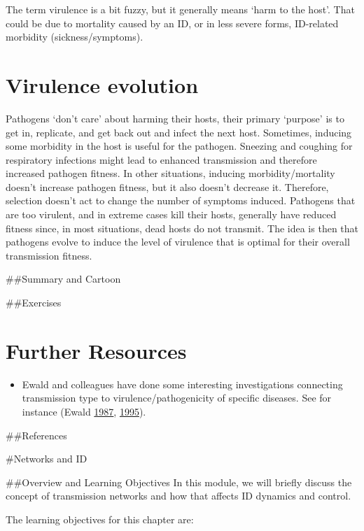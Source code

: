 \documentclass[]{book}
\providecommand{\tightlist}{%
  \setlength{\itemsep}{0pt}\setlength{\parskip}{0pt}}
\theoremstyle{definition}
\theoremstyle{definition}
\theoremstyle{definition}
\theoremstyle{remark}
\begin{document}
The term virulence is a bit fuzzy, but it generally means `harm to the
host'. That could be due to mortality caused by an ID, or in less severe
forms, ID-related morbidity (sickness/symptoms).

\hypertarget{virulence-evolution}{%
\section{Virulence evolution}\label{virulence-evolution}}

Pathogens `don't care' about harming their hosts, their primary
`purpose' is to get in, replicate, and get back out and infect the next
host. Sometimes, inducing some morbidity in the host is useful for the
pathogen. Sneezing and coughing for respiratory infections might lead to
enhanced transmission and therefore increased pathogen fitness. In other
situations, inducing morbidity/mortality doesn't increase pathogen
fitness, but it also doesn't decrease it. Therefore, selection doesn't
act to change the number of symptoms induced. Pathogens that are too
virulent, and in extreme cases kill their hosts, generally have reduced
fitness since, in most situations, dead hosts do not transmit. The idea
is then that pathogens evolve to induce the level of virulence that is
optimal for their overall transmission fitness.

\#\#Summary and Cartoon

\#\#Exercises

\hypertarget{further-resources-10}{%
\section{Further Resources}\label{further-resources-10}}

\begin{itemize}
\tightlist
\item
  Ewald and colleagues have done some interesting investigations
  connecting transmission type to virulence/pathogenicity of specific
  diseases. See for instance (Ewald
  \protect\hyperlink{ref-ewald87}{1987},
  \protect\hyperlink{ref-ewald95}{1995}).
\end{itemize}

\#\#References

\#Networks and ID

\#\#Overview and Learning Objectives In this module, we will briefly
discuss the concept of transmission networks and how that affects ID
dynamics and control.

The learning objectives for this chapter are:
\end{document}
